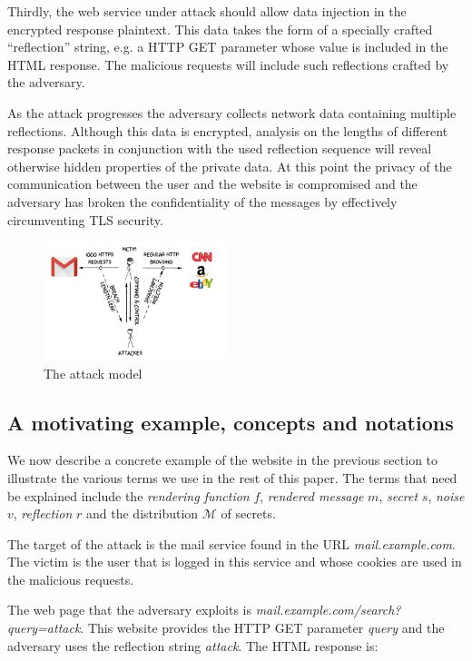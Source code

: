 Thirdly, the web service under attack should allow data injection in the
encrypted response plaintext. This data takes the form of a specially crafted
``reflection'' string, e.g. a HTTP GET parameter whose value is included
in the HTML response. The malicious requests will include such reflections
crafted by the adversary.

As the attack progresses the adversary collects network data containing multiple
reflections. Although this data is encrypted, analysis on the lengths of
different response packets in conjunction with the used reflection sequence will
reveal otherwise hidden properties of the private data. At this point the
privacy of the communication between the user and the website is compromised and
the adversary has broken the confidentiality of the messages by effectively
circumventing TLS security.

    \begin{figure}[thpb]
        \centering
            \includegraphics[width=0.48\textwidth]{figures/attack_model.png}
        \caption{The attack model}
        \label{fig:attack_model}
    \end{figure}

\subsection{A motivating example, concepts and notations}\label{subsec:terms}
We now describe a concrete example of the website in the previous section to
illustrate the various terms we use in the rest of this paper. The terms that
need be explained include the \textit{rendering function} $f$, \textit{rendered
message} $m$, \textit{secret} $s$, \textit{noise} $v$, \textit{reflection} $r$
and the distribution $\mathcal{M}$ of secrets.

The target of the attack is the mail service found in the URL
\textit{mail.example.com}. The victim is the user that is logged in this service
and whose cookies are used in the malicious requests.

The web page that the adversary exploits is
\textit{mail.example.com/search?query=attack}. This website provides the HTTP
GET parameter \textit{query} and the adversary uses the reflection string
\textit{attack}. The HTML response is:

